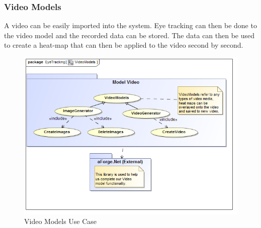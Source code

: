 		
	\subsubsection{Video Models}
	A video can be easily imported into the system. Eye tracking can then be done to the video model and the recorded data can be stored. The data can then be used to create a heat-map that can then be applied to the video second by second.
	\newline
	
	\begin{figure}[!ht]
		\centering
		\includegraphics[scale=0.5,width=15cm,keepaspectratio]{Diagrams/Use_Case_Diagram__VideoModels.png}
		\caption{Video Models Use Case}
	\end{figure}
	
